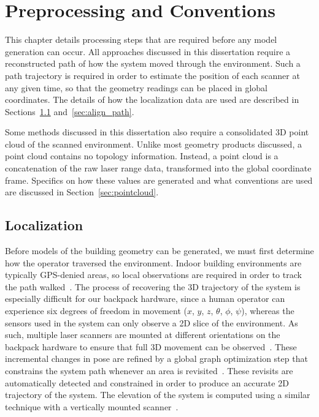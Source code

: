 \documentclass[12pt,onecolumn,oneside]{book}
\begin{document}

\chapter{Preprocessing and Conventions}
\label{ch:preprocessing}

This chapter details processing steps that are required before any model generation can occur.  All approaches discussed in this dissertation require a reconstructed path of how the system moved through the environment.  Such a path trajectory is required in order to estimate the position of each scanner at any given time, so that the geometry readings can be placed in global coordinates.  The details of how the localization data are used are described in Sections~\ref{sec:localization} and~\ref{sec:align_path}.

Some methods discussed in this dissertation also require a consolidated 3D point cloud of the scanned environment.  Unlike most geometry products discussed, a point cloud contains no topology information.  Instead, a point cloud is a concatenation of the raw laser range data, transformed into the global coordinate frame.  Specifics on how these values are generated and what conventions are used are discussed in Section~\ref{sec:pointcloud}.

\section{Localization}
\label{sec:localization}

Before models of the building geometry can be generated, we must first determine how the operator traversed the environment.  Indoor building environments are typically GPS-denied areas, so local observations are required in order to track the path walked~\cite{Backpack,Localization,NickJournal}.  The process of recovering the 3D trajectory of the system is especially difficult for our backpack hardware, since a human operator can experience six degrees of freedom in movement ($x$, $y$, $z$, $\theta$, $\phi$, $\psi$), whereas the sensors used in the system can only observe a 2D slice of the environment.  As such, multiple laser scanners are mounted at different orientations on the backpack hardware to ensure that full 3D movement can be observed~\cite{NickJournal}.  These incremental changes in pose are refined by a global graph optimization step that constrains the system path whenever an area is revisited~\cite{toro07}.  These revisits are automatically detected and constrained in order to produce an accurate 2D trajectory of the system.  The elevation of the system is computed using a similar technique with a vertically mounted scanner~\cite{Backpack}.
\end{document}
